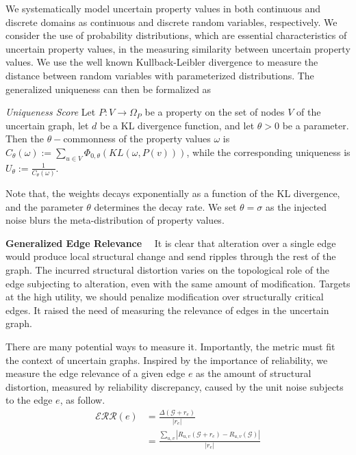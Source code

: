 We systematically model uncertain property values in both continuous and discrete domains as continuous and discrete random variables, respectively.
We consider the use of probability distributions, which are essential characteristics of uncertain property values, in the measuring similarity between uncertain property values. 
We use the well known Kullback-Leibler divergence to measure the distance between random variables with parameterized distributions. 
The generalized uniqueness can then be formalized as
\begin{definition}
    \textit{Uniqueness Score}
     Let $P:V \rightarrow  \Omega_{P}$ be a property on the set of nodes $V$ of the uncertain graph, 
     let $d$ be a KL divergence function, and let $\theta >0$  be a parameter. 
       Then the $\theta-$commonness of the property values $\omega$
       is $C_{\theta}(\omega):= \sum_{u \in V} \Phi_{0,\theta}(KL(\omega, P(v)))$,   
     while the corresponding uniqueness is $U_{\theta}:= \frac{1}{C_{\theta}(\omega)}$. 
     \vspace{-2pt}
\end{definition} 
Note that, the weights decays exponentially as a function of the KL divergence, 
and the parameter $\theta$ determines the decay rate. 
We set $\theta=\sigma$ as the injected noise blurs the meta-distribution of property values. 
 
\textbf{Generalized Edge Relevance}~~
It is clear that alteration over a single edge would produce local structural change and send ripples through the rest of the graph. 
The incurred structural distortion varies on the topological role of the edge subjecting to alteration, even with the same amount of modification. 
Targets at the high utility, we should penalize modification over structurally critical edges.  
It raised the need of measuring the relevance of edges in the uncertain graph. 


There are many potential ways to measure it. 
Importantly, the metric must fit the context of uncertain graphs.
Inspired by the importance of reliability, we measure the edge relevance of a given edge $e$ as the amount of structural distortion, measured by reliability discrepancy, caused by the unit noise subjects to the edge $e$, as follow. 
\begin{equation*}
  \begin{split}
    \mathcal{ERR}({e}) &= \frac{\Delta(\mathcal{G}+r_{e})}{|r_{e}|}  \\
                       &= \frac{\sum_{u,v} |R_{u,v}(\mathcal{G}+r_{e}) -R_{u,v}(\mathcal{G})|} {|r_{e}|}
  \end{split}
\end{equation*}

